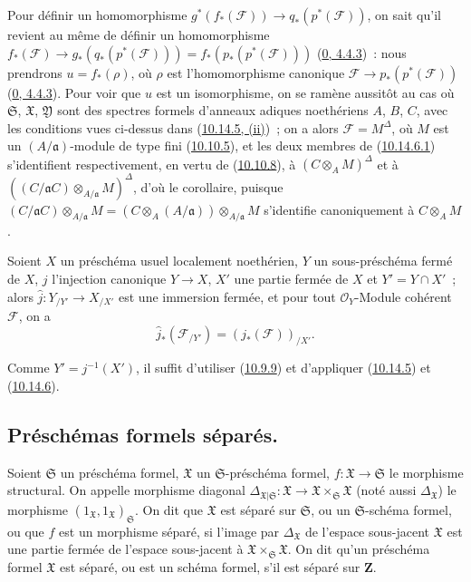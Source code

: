 Pour définir un homomorphisme
$g^*(f_*(\mathscr{F}))\to q_*(p^*(\mathscr{F}))$, on sait qu'il revient au
même de définir un homomorphisme
$f_*(\mathscr{F})\to g_*(q_*(p^*(\mathscr{F})))
=f_*(p_*(p^*(\mathscr{F})))$
(\hyperref[0.4.4.3-fr]{0, 4.4.3})~: nous prendrons $u=f_*(\rho)$, où $\rho$
est l'homomorphisme canonique
$\mathscr{F}\to p_*(p^*(\mathscr{F}))$
(\hyperref[0.4.4.3-fr]{0, 4.4.3}). Pour voir que $u$ est un isomorphisme, on
se ramène aussitôt au cas où $\mathfrak{S}$, $\mathfrak{X}$,
$\mathfrak{Y}$ sont des spectres formels d'anneaux adiques noethériens $A$,
$B$, $C$, avec les conditions vues ci-dessus dans
(\hyperref[I.10.14.5-fr]{10.14.5, (ii)})~; on a alors
$\mathscr{F}=M^\Delta$, où $M$ est un $(A/\mathfrak{a})$-module de type fini
(\hyperref[I.10.10.5-fr]{10.10.5}), et les deux membres de
(\hyperref[I.10.14.6.1-fr]{10.14.6.1}) s'identifient respectivement, en vertu
de (\hyperref[I.10.10.8-fr]{10.10.8}), à
$(C\otimes_A M)^\Delta$ et à
$((C/\mathfrak{a}C)\otimes_{A/\mathfrak{a}}M)^\Delta$, d'où le corollaire,
puisque
$(C/\mathfrak{a}C)\otimes_{A/\mathfrak{a}}M
=(C\otimes_A(A/\mathfrak{a}))\otimes_{A/\mathfrak{a}}M$ s'identifie
canoniquement à $C\otimes_A M$.

\begin{corollary}[10.14.7]
\label{I.10.14.7-fr}
Soient $X$ un préschéma usuel localement noethérien, $Y$ un sous-préschéma
fermé de $X$, $j$ l'injection canonique $Y\to X$, $X'$ une partie fermée de
$X$ et $Y'=Y\cap X'$~; alors
$\widehat{j}:Y_{/Y'}\to X_{/X'}$ est une immersion fermée, et pour tout
$\mathscr{O}_Y$-Module cohérent $\mathscr{F}$, on a
\[
  \widehat{j}_*(\mathscr{F}_{/Y'})=(j_*(\mathscr{F}))_{/X'}.
\]
\end{corollary}

Comme $Y'=j^{-1}(X')$, il suffit d'utiliser
(\hyperref[I.10.9.9-fr]{10.9.9}) et d'appliquer
(\hyperref[I.10.14.5-fr]{10.14.5}) et
(\hyperref[I.10.14.6-fr]{10.14.6}).

\subsection{Préschémas formels séparés.}
\label{subsection:I.10.15-fr}

\begin{definition}[10.15.1]
\label{I.10.15.1-fr}
Soient $\mathfrak{S}$ un préschéma formel, $\mathfrak{X}$ un
$\mathfrak{S}$-préschéma formel,
$f:\mathfrak{X}\to\mathfrak{S}$ le morphisme structural. On appelle
morphisme diagonal
$\Delta_{\mathfrak{X}|\mathfrak{S}}:\mathfrak{X}\to
\mathfrak{X}\times_{\mathfrak{S}}\mathfrak{X}$ (noté aussi
$\Delta_{\mathfrak{X}}$) le morphisme
$(1_{\mathfrak{X}},1_{\mathfrak{X}})_{\mathfrak{S}}$. On dit que
$\mathfrak{X}$ est séparé sur $\mathfrak{S}$, ou un
$\mathfrak{S}$-schéma formel, ou que $f$ est un morphisme séparé, si l'image
par $\Delta_{\mathfrak{X}}$ de l'espace sous-jacent $\mathfrak{X}$ est une
partie fermée de l'espace sous-jacent à
$\mathfrak{X}\times_{\mathfrak{S}}\mathfrak{X}$. On dit qu'un préschéma
formel $\mathfrak{X}$ est séparé, ou est un schéma formel, s'il est séparé
sur $\mathbf{Z}$.
\end{definition}

